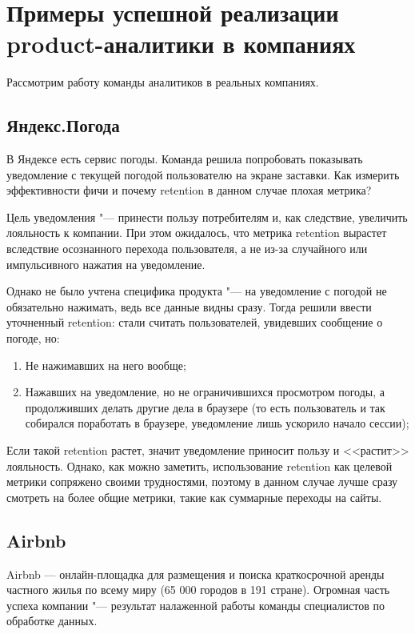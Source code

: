 \documentclass[referat, times]{SCWorks}
\begin{document}
\section{Примеры успешной реализации product-аналитики в компаниях}
Рассмотрим работу команды аналитиков в реальных компаниях.
\subsection{Яндекс.Погода}
В Яндексе есть сервис погоды. Команда решила попробовать показывать уведомление с текущей погодой пользователю на экране заставки. Как измерить эффективности фичи и почему retention в данном случае плохая метрика?

Цель уведомления "--- принести пользу потребителям и, как следствие, увеличить лояльность к компании. При этом ожидалось, что метрика retention вырастет вследствие осознанного перехода пользователя, а не из-за случайного или импульсивного нажатия на уведомление.

Однако не было учтена специфика продукта "--- на уведомление с погодой не обязательно нажимать, ведь все данные видны сразу. Тогда решили ввести уточненный retention: стали считать пользователей, увидевших сообщение о погоде, но:

\begin{enumerate}
    \item Не нажимавших на него вообще;
    \item Нажавших на уведомление, но не ограничившихся просмотром погоды, а продолживших делать другие дела в браузере 
    (то есть пользователь и так собирался поработать в браузере, уведомление лишь ускорило начало сессии);
\end{enumerate}

Если такой retention растет, значит уведомление приносит пользу и <<растит>> лояльность. Однако, как можно заметить, использование retention как целевой метрики сопряжено своими трудностями, поэтому в данном случае лучше сразу смотреть на более общие метрики, такие как суммарные переходы на сайты\cite{yandexWeather}.

\subsection{Airbnb}
Airbnb — онлайн-площадка для размещения и поиска краткосрочной аренды частного жилья по всему миру (65 000 городов в 191 стране). Огромная часть успеха компании "--- результат налаженной работы команды специалистов по обработке данных.
\end{document}
